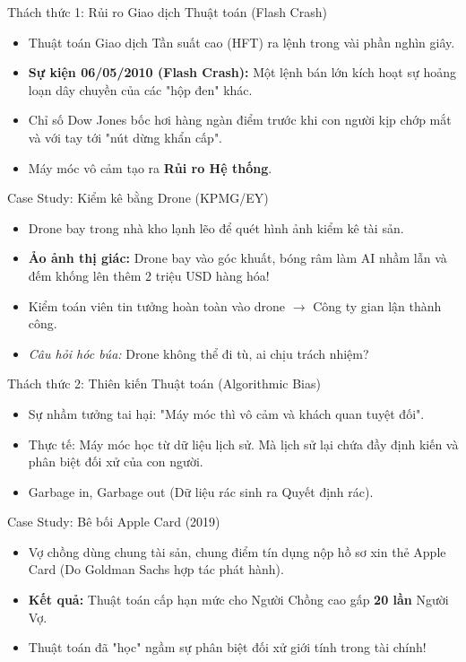 \documentclass[aspectratio=169,12pt]{beamer}
\begin{document}
\begin{frame}{Thách thức 1: Rủi ro Giao dịch Thuật toán (Flash Crash)}
    \begin{itemize}
        \item Thuật toán Giao dịch Tần suất cao (HFT) ra lệnh trong vài phần nghìn giây.
        \item \textbf{Sự kiện 06/05/2010 (Flash Crash):} Một lệnh bán lớn kích hoạt sự hoảng loạn dây chuyền của các "hộp đen" khác.
        \item Chỉ số Dow Jones bốc hơi hàng ngàn điểm trước khi con người kịp chớp mắt và với tay tới "nút dừng khẩn cấp".
        \item Máy móc vô cảm tạo ra \textbf{Rủi ro Hệ thống}.
    \end{itemize}
\end{frame}

\begin{frame}{Case Study: Kiểm kê bằng Drone (KPMG/EY)}
    \begin{itemize}
        \item Drone bay trong nhà kho lạnh lẽo để quét hình ảnh kiểm kê tài sản.
        \item \textbf{Ảo ảnh thị giác:} Drone bay vào góc khuất, bóng râm làm AI nhầm lẫn và đếm khống lên thêm 2 triệu USD hàng hóa!
        \item Kiểm toán viên tin tưởng hoàn toàn vào drone $\rightarrow$ Công ty gian lận thành công.
        \item \textit{Câu hỏi hóc búa:} Drone không thể đi tù, ai chịu trách nhiệm?
    \end{itemize}
\end{frame}

\begin{frame}{Thách thức 2: Thiên kiến Thuật toán (Algorithmic Bias)}
    \begin{itemize}
        \item Sự nhầm tưởng tai hại: "Máy móc thì vô cảm và khách quan tuyệt đối".
        \item Thực tế: Máy móc học từ dữ liệu lịch sử. Mà lịch sử lại chứa đầy định kiến và phân biệt đối xử của con người.
        \item Garbage in, Garbage out (Dữ liệu rác sinh ra Quyết định rác).
    \end{itemize}
\end{frame}

\begin{frame}{Case Study: Bê bối Apple Card (2019)}
    \begin{itemize}
        \item Vợ chồng dùng chung tài sản, chung điểm tín dụng nộp hồ sơ xin thẻ Apple Card (Do Goldman Sachs hợp tác phát hành).
        \item \textbf{Kết quả:} Thuật toán cấp hạn mức cho Người Chồng cao gấp \textbf{20 lần} Người Vợ.
        \item Thuật toán đã "học" ngầm sự phân biệt đối xử giới tính trong tài chính!
    \end{itemize}
\end{frame}
\end{document}

